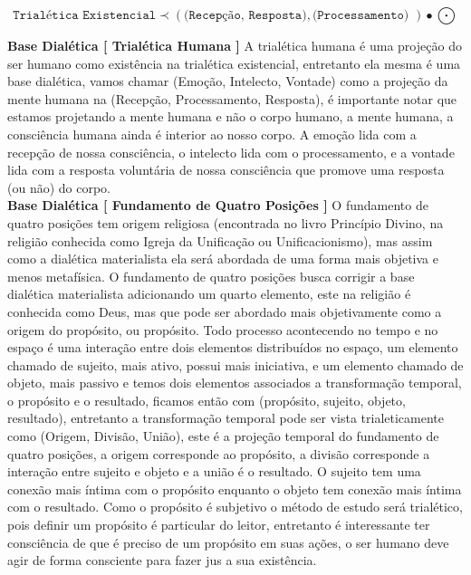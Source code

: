 \documentclass[10pt,a4paper]{report}
\begin{document}
$$ \texttt{Trialética Existencial} \prec ( \texttt{(Recepção, Resposta)}, \texttt{(Processamento) } ) \bullet \bigodot $$


\textbf{Base Dialética [ Trialética Humana ]} A trialética humana é uma projeção do ser humano como existência na trialética existencial, entretanto ela mesma é uma base dialética, vamos chamar (Emoção, Intelecto, Vontade) como a projeção da mente humana na (Recepção, Processamento, Resposta), é importante notar que estamos projetando a mente humana e não o corpo humano, a mente humana, a consciência humana ainda é interior ao nosso corpo. A emoção lida com a recepção de nossa consciência, o intelecto lida com o processamento, e a vontade lida com a resposta voluntária de nossa consciência que promove uma resposta (ou não) do corpo.\\

\textbf{Base Dialética [ Fundamento de Quatro Posições ]} O fundamento de quatro posições tem origem religiosa (encontrada no livro Princípio Divino, na religião conhecida como Igreja da Unificação ou Unificacionismo), mas assim como a dialética materialista ela será abordada de uma forma mais objetiva e menos metafísica. O fundamento de quatro posições busca corrigir a base dialética materialista adicionando um quarto elemento, este na religião é conhecida como Deus, mas que pode ser abordado mais objetivamente como a origem do propósito, ou propósito. Todo processo acontecendo no tempo e no espaço é uma interação entre dois elementos distribuídos no espaço, um elemento chamado de sujeito, mais ativo, possui mais iniciativa, e um elemento chamado de objeto, mais passivo e temos dois elementos associados a transformação temporal, o propósito e o resultado, ficamos então com (propósito, sujeito, objeto, resultado), entretanto a transformação temporal pode ser vista trialeticamente como (Origem, Divisão, União), este é a projeção temporal do fundamento de quatro posições, a origem corresponde ao propósito, a divisão corresponde a interação entre sujeito e objeto e a união é o resultado. O sujeito tem uma conexão mais íntima com o propósito enquanto o objeto tem conexão mais íntima com o resultado. Como o propósito é subjetivo o método de estudo será trialético, pois definir um propósito é particular do leitor, entretanto é interessante ter consciência de que é preciso de um propósito em suas ações, o ser humano deve agir de forma consciente para fazer jus a sua existência.\\
\end{document}
